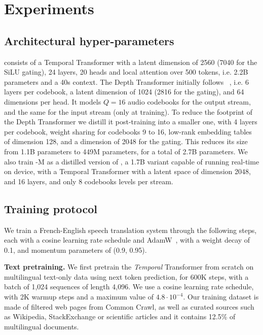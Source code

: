 \section{Experiments}
\label{sec:experiments}
\subsection{Architectural hyper-parameters}
\label{sec:arch_hyperparams}

\ours consists of a Temporal Transformer
with a latent dimension of 2560 (7040 for the SiLU gating), 24 layers, 20 heads and local attention over 500 tokens, i.e. 2.2B parameters and a 40s context. The Depth Transformer initially follows
~\citet{moshi}, i.e. 6 layers per codebook,
a latent dimension of 1024 (2816 for the gating), and 64 dimensions per head. It models $Q=16$ audio codebooks
for the output stream, and the same for the input stream (only at training). To reduce the footprint of the Depth Transformer we distill it post-training
into a smaller one, with 4 layers per codebook, weight sharing for codebooks 9 to 16, low-rank embedding tables of dimension 128, and a dimension of 2048 for the gating. This reduces its size from 1.1B parameters to 449M parameters, for a total of 2.7B parameters.
We also train \ours-M as a distilled version of \ours, a 1.7B variant capable of running real-time on device, with a Temporal Transformer with
a latent space of dimension 2048, and 16 layers, and only 8 codebooks levels per stream.

\subsection{Training protocol}

We train a French-English speech translation system through the following steps, each with a cosine learning rate schedule and AdamW~\citep{adamw}, with a weight decay of 0.1, and momentum parameters of (0.9, 0.95).

\textbf{Text pretraining.}
We first pretrain the \textit{Temporal} Transformer from scratch on multilingual text-only data using next token prediction, for 600K steps, with a batch of 1,024 sequences of length 4,096. We use a cosine learning rate schedule, with 2K warmup steps and a maximum value of $4.8\cdot10^{-4}$. Our training dataset is made of filtered web pages from Common Crawl, as well as curated sources such as Wikipedia, StackExchange or scientific articles and it contains 12.5\% of multilingual documents.

